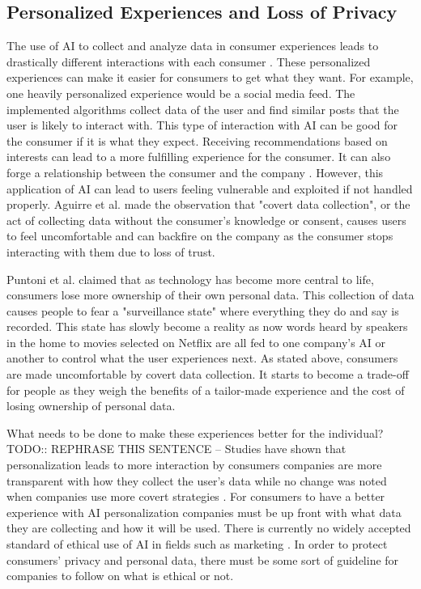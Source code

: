 \documentclass[12pt, man]{apa6}
\begin{document}
\subsection*{Personalized Experiences and Loss of Privacy}
The use of AI to collect and analyze data in consumer experiences leads to drastically different interactions with each consumer \parencite{Puntoni2021}.  These personalized experiences can make it easier for consumers to get what they want.  For example, one heavily personalized experience would be a social media feed.  The implemented algorithms collect data of the user and find similar posts that the user is likely to interact with.
This type of interaction with AI can be good for the consumer if it is what they expect.  Receiving recommendations based on interests can lead to a more fulfilling experience for the consumer.  It can also forge a relationship between the consumer and the company \parencite{Kumar2019}.  However, this application of AI can lead to users feeling vulnerable and exploited if not handled properly.  Aguirre et al. \parencite*{Aguirre2015} made the observation that "covert data collection", or the act of collecting data without the consumer's knowledge or consent, causes users to feel uncomfortable and can backfire on the company as the consumer stops interacting with them due to loss of trust.

Puntoni et al. \parencite*{Puntoni2021} claimed that as technology has become more central to life, consumers lose more ownership of their own personal data. This collection of data causes people to fear a "surveillance state" where everything they do and say is recorded.  This state has slowly become a reality as now words heard by speakers in the home to movies selected on Netflix are all fed to one company's AI or another to control what the user experiences next. As stated above, consumers are made uncomfortable by covert data collection.  It starts to become a trade-off for people as they weigh the benefits of a tailor-made experience and the cost of losing ownership of personal data.

What needs to be done to make these experiences better for the individual?  TODO:: REPHRASE THIS SENTENCE -- Studies have shown that personalization leads to more interaction by consumers companies are more transparent with how they collect the user's data while no change was noted when companies use more covert strategies \parencite{Aguirre2015}.  For consumers to have a better experience with AI personalization companies must be up front with what data they are collecting and how it will be used.  There is currently no widely accepted standard of ethical use of AI in fields such as marketing \parencite{Puntoni2021}.  In order to protect consumers' privacy and personal data, there must be some sort of guideline for companies to follow on what is ethical or not.
\end{document}
